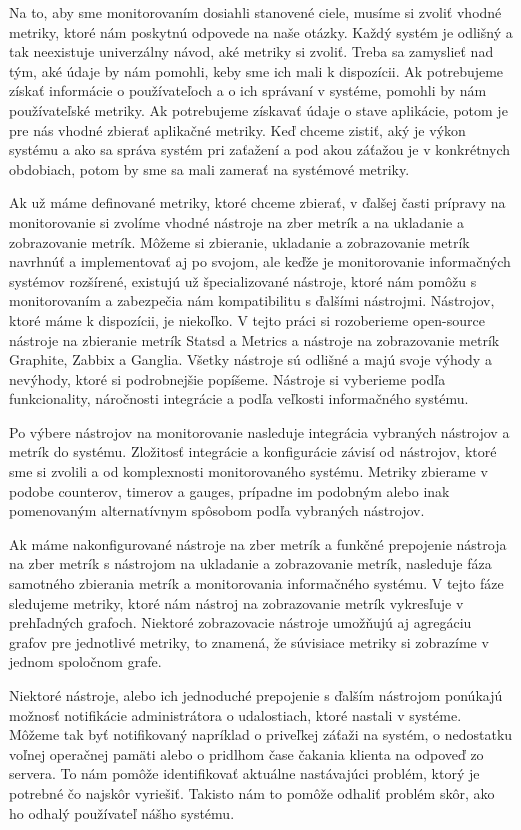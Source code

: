 \documentclass[a4paper, usesections, upjsfrontpage, thesismargins, thesislinespacing]{rnthesis}
\begin{document}
Na to, aby sme monitorovaním dosiahli stanovené ciele, musíme si zvoliť vhodné metriky, 
	ktoré nám poskytnú odpovede na naše otázky.
Každý systém je odlišný a tak neexistuje univerzálny návod, aké metriky si zvoliť.
Treba sa zamyslieť nad tým, aké údaje by nám pomohli, keby sme ich mali k dispozícii.
Ak potrebujeme získať informácie o používateľoch a o ich správaní v systéme, pomohli by nám používateľské metriky.
Ak potrebujeme získavať údaje o stave aplikácie, potom je pre nás vhodné zbierať aplikačné metriky.
Keď chceme zistiť, aký je výkon systému a ako sa správa systém pri zaťažení a pod akou záťažou je v konkrétnych obdobiach, potom by sme sa mali zamerať na systémové metriky.

Ak už máme definované metriky, ktoré chceme zbierať, v ďalšej časti prípravy na monitorovanie si zvolíme vhodné nástroje na zber 	metrík a na ukladanie a zobrazovanie metrík.
Môžeme si zbieranie, ukladanie a zobrazovanie metrík navrhnúť a implementovať aj po svojom, ale keďže je monitorovanie informačných systémov rozšírené, existujú už špecializované nástroje, ktoré nám pomôžu s monitorovaním a zabezpečia nám kompatibilitu s ďalšími nástrojmi.
Nástrojov, ktoré máme k dispozícii, je niekoľko.
V tejto práci si rozoberieme open-source nástroje na zbieranie metrík Statsd a Metrics a nástroje na zobrazovanie metrík Graphite, Zabbix a Ganglia.
Všetky nástroje sú odlišné a majú svoje výhody a nevýhody, ktoré si podrobnejšie popíšeme.
Nástroje si vyberieme podľa funkcionality, náročnosti integrácie a podľa veľkosti informačného systému.

Po výbere nástrojov na monitorovanie nasleduje integrácia vybraných nástrojov a metrík do systému.
Zložitosť integrácie a konfigurácie závisí od nástrojov, ktoré sme si zvolili a od komplexnosti monitorovaného systému.
Metriky zbierame v podobe counterov, timerov a gauges, prípadne im podobným alebo inak pomenovaným alternatívnym spôsobom podľa vybraných nástrojov.

Ak máme nakonfigurované nástroje na zber metrík a funkčné prepojenie nástroja na zber metrík s nástrojom na ukladanie a zobrazovanie metrík, nasleduje fáza samotného zbierania metrík a monitorovania informačného systému.
V tejto fáze sledujeme metriky, ktoré nám nástroj na zobrazovanie metrík vykresľuje v prehľadných grafoch.
Niektoré zobrazovacie nástroje umožňujú aj agregáciu grafov pre jednotlivé metriky, to znamená, že súvisiace metriky si zobrazíme v jednom spoločnom grafe. 

Niektoré nástroje, alebo ich jednoduché prepojenie s ďalším nástrojom ponúkajú možnosť notifikácie administrátora o udalostiach, ktoré nastali v systéme.
Môžeme tak byť notifikovaný napríklad o priveľkej záťaži na systém, o nedostatku voľnej operačnej pamäti alebo o pridlhom čase čakania klienta na odpoveď zo servera.
To nám pomôže identifikovať aktuálne nastávajúci problém, ktorý je potrebné čo najskôr vyriešiť.
Takisto nám to pomôže odhaliť problém skôr, ako ho odhalý používateľ nášho systému.
\end{document}

